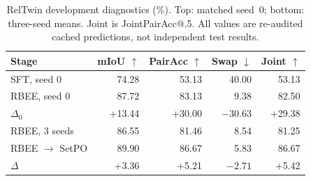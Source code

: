 \begin{table}[t]
\centering
\caption{RelTwin development diagnostics (\%). Top: matched seed~0; bottom: three-seed means. Joint is JointPairAcc@.5. All values are re-audited cached predictions, not independent test results.}
\label{tab:relations}
\small
\setlength{\tabcolsep}{3pt}
\begin{tabular}{@{}lrrrr@{}}
\toprule
Stage & mIoU $\uparrow$ & PairAcc $\uparrow$ & Swap $\downarrow$ & Joint $\uparrow$\\
\midrule
SFT, seed 0 & 74.28 & 53.13 & 40.00 & 53.13\\
RBEE, seed 0 & 87.72 & 83.13 & 9.38 & 82.50\\
$\Delta_0$ & +13.44 & +30.00 & $-30.63$ & +29.38\\
\midrule
RBEE, 3 seeds & 86.55 & 81.46 & 8.54 & 81.25\\
RBEE $\to$ SetPO & 89.90 & 86.67 & 5.83 & 86.67\\
$\Delta$ & +3.36 & +5.21 & $-2.71$ & +5.42\\
\bottomrule
\end{tabular}
\end{table}
